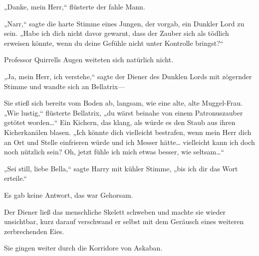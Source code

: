 „Danke, mein Herr,“ flüsterte der fahle Mann.

„Narr,“ sagte die harte Stimme eines Jungen, der vorgab, ein Dunkler Lord zu sein. „Habe ich dich nicht davor gewarnt, dass der Zauber sich als tödlich erweisen könnte, wenn du deine Gefühle nicht unter Kontrolle bringst?“

Professor Quirrells Augen weiteten sich natürlich nicht.

„Ja, mein Herr, ich verstehe,“ sagte der Diener des Dunklen Lords mit zögernder Stimme und wandte sich an Bellatrix—

Sie stieß sich bereits vom Boden ab, langsam, wie eine alte, alte Muggel-Frau. „Wie lustig,“ flüsterte Bellatrix, „du wärst beinahe von einem Patronuszauber getötet worden…“ Ein Kichern, das klang, als würde es den Staub aus ihren Kicherkanälen blasen. „Ich könnte dich vielleicht bestrafen, wenn mein Herr dich an Ort und Stelle einfrieren würde und ich Messer hätte… vielleicht kann ich doch noch nützlich sein? Oh, jetzt fühle ich mich etwas besser, wie seltsam…“

„Sei still, liebe Bella,“ sagte Harry mit kühler Stimme, „bis ich dir das Wort erteile.“

Es gab keine Antwort, das war Gehorsam.

Der Diener ließ das menschliche Skelett schweben und machte sie wieder unsichtbar, kurz darauf verschwand er selbst mit dem Geräusch eines weiteren zerbrechenden Eies.

Sie gingen weiter durch die Korridore von Askaban.

